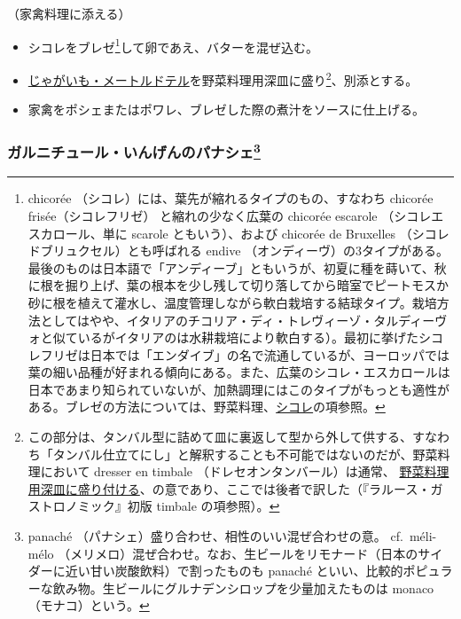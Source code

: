 \begin{recette}


（家禽料理に添える）

\begin{itemize}
\item
  シコレをブレゼ\footnote{chicorée
    （シコレ）には、葉先が縮れるタイプのもの、すなわち chicorée
    frisée（シコレフリゼ） と縮れの少なく広葉の chicorée escarole
    （シコレエスカロール、単に scarole ともいう）、および chicorée de
    Bruxelles （シコレドブリュクセル）とも呼ばれる endive
    （オンディーヴ）の3タイプがある。最後のものは日本語で「アンディーブ」ともいうが、初夏に種を蒔いて、秋に根を掘り上げ、葉の根本を少し残して切り落してから暗室でピートモスか砂に根を植えて灌水し、温度管理しながら軟白栽培する結球タイプ。栽培方法としてはやや、イタリアのチコリア・ディ・トレヴィーゾ・タルディーヴォと似ているがイタリアのは水耕栽培により軟白する）。最初に挙げたシコレフリゼは日本では「エンダイブ」の名で流通しているが、ヨーロッパでは葉の細い品種が好まれる傾向にある。また、広葉のシコレ・エスカロールは日本であまり知られていないが、加熱調理にはこのタイプがもっとも適性がある。ブレゼの方法については、野菜料理、\protect\hyperlink{chicoree}{シコレ}の項参照。}して卵であえ、バターを混ぜ込む。
\item
  \protect\hyperlink{pommes-de-terre-a-la-maitre-d-hotel}{じゃがいも・メートルドテル}を野菜料理用深皿に盛り\footnote{この部分は、タンバル型に詰めて皿に裏返して型から外して供する、すなわち「タンバル仕立てにし」と解釈することも不可能ではないのだが、野菜料理において
    dresser en timbale （ドレセオンタンバール）は通常、
    \ul{野菜料理用深皿に盛り付ける}、の意であり、ここでは後者で訳した（『ラルース・ガストロノミック』初版
    timbale の項参照）。}、別添とする。
\item
  家禽をポシェまたはポワレ、ブレゼした際の煮汁をソースに仕上げる。
\end{itemize}

\hypertarget{garniture-de-haricots-panaches}{%
\subsubsection[ガルニチュール・いんげんのパナシェ]{\texorpdfstring{ガルニチュール・いんげんのパナシェ\footnote{panaché
  （パナシェ）盛り合わせ、相性のいい混ぜ合わせの意。 cf.~méli-mélo
  （メリメロ）混ぜ合わせ。なお、生ビールをリモナード（日本のサイダーに近い甘い炭酸飲料）で割ったものも
  panaché
  といい、比較的ポピュラーな飲み物。生ビールにグルナデンシロップを少量加えたものは
  monaco （モナコ）という。}}{ガルニチュール・いんげんのパナシェ}}\label{garniture-de-haricots-panaches}}


\end{recette}
